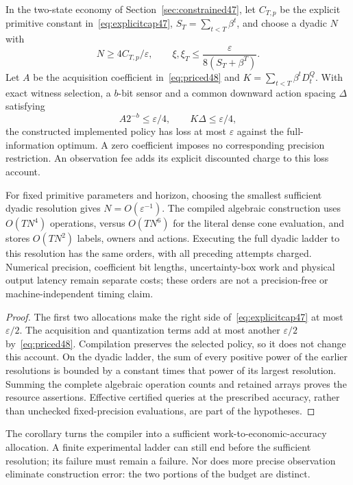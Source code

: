 \begin{corollary}\label{cor:work-accuracy48}
In the two-state economy of Section~\ref{sec:constrained47}, let $C_{T,p}$ be the explicit primitive constant in~\eqref{eq:explicitcap47}, $S_T=\sum_{t<T}\beta^t$, and choose a dyadic $N$ with
\[
 N\ge 4C_{T,p}/\varepsilon,\qquad
 \xi,\xi_T\le\frac{\varepsilon}{8(S_T+\beta^T)}.
\]
Let $A$ be the acquisition coefficient in~\eqref{eq:priced48} and $K=\sum_{t<T}\beta^tD_t^Q$. With exact witness selection, a $b$-bit sensor and a common downward action spacing $\Delta$ satisfying
\[
 A2^{-b}\le\varepsilon/4,\qquad K\Delta\le\varepsilon/4,
\]
the constructed implemented policy has loss at most $\varepsilon$ against the full-information optimum. A zero coefficient imposes no corresponding precision restriction. An observation fee adds its explicit discounted charge to this loss account.

For fixed primitive parameters and horizon, choosing the smallest sufficient dyadic resolution gives $N=O(\varepsilon^{-1})$. The compiled algebraic construction uses $O(TN^4)$ operations, versus $O(TN^6)$ for the literal dense cone evaluation, and stores $O(TN^2)$ labels, owners and actions. Executing the full dyadic ladder to this resolution has the same orders, with all preceding attempts charged. Numerical precision, coefficient bit lengths, uncertainty-box work and physical output latency remain separate costs; these orders are not a precision-free or machine-independent timing claim.
\end{corollary}
\begin{proof}
The first two allocations make the right side of~\eqref{eq:explicitcap47} at most $\varepsilon/2$. The acquisition and quantization terms add at most another $\varepsilon/2$ by~\eqref{eq:priced48}. Compilation preserves the selected policy, so it does not change this account. On the dyadic ladder, the sum of every positive power of the earlier resolutions is bounded by a constant times that power of its largest resolution. Summing the complete algebraic operation counts and retained arrays proves the resource assertions. Effective certified queries at the prescribed accuracy, rather than unchecked fixed-precision evaluations, are part of the hypotheses.
\end{proof}

The corollary turns the compiler into a sufficient work-to-economic-accuracy allocation. A finite experimental ladder can still end before the sufficient resolution; its failure must remain a failure. Nor does more precise observation eliminate construction error: the two portions of the budget are distinct.

